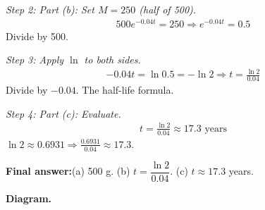 \documentclass[11pt]{article}
\begin{document}
\textit{Step 2: Part (b): Set \( M = 250 \) (half of 500).}
\[\begin{gathered}
500e^{-0.04t} = 250 \Rightarrow e^{-0.04t} = 0.5
\end{gathered}\]
Divide by 500.

\textit{Step 3: Apply \( \ln \) to both sides.}
\[\begin{gathered}
-0.04t = \ln 0.5 = -\ln 2 \Rightarrow t = \frac{\ln 2}{0.04}
\end{gathered}\]
Divide by \( -0.04 \). The half-life formula.

\textit{Step 4: Part (c): Evaluate.}
\[\begin{gathered}
t = \frac{\ln 2}{0.04} \approx 17.3 \text{ years}
\end{gathered}\]
\( \ln 2 \approx 0.6931 \Rightarrow \frac{0.6931}{0.04} \approx 17.3 \).

\begin{answerbox}
\textbf{Final answer:}\quad (a) 500 g. (b) \(\displaystyle  t = \dfrac{\ln 2}{0.04} \). (c) \(\displaystyle  t \approx 17.3 \) years.
\end{answerbox}
\textbf{Diagram.}
\end{document}
